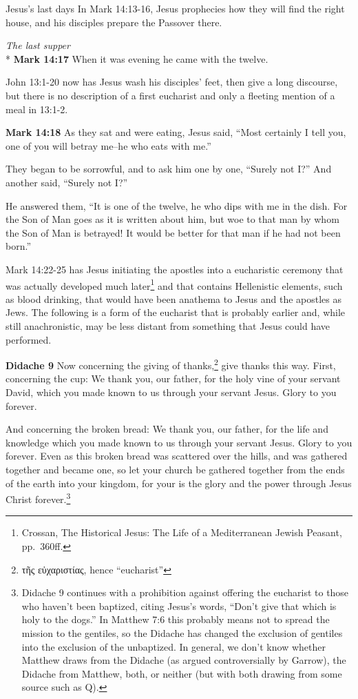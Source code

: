 \documentclass[10pt,a5paper,twoside]{article}
\newcommand{\doimage}[2]{\texttt{[image: \#2]}\label{fig:#2}}
\newcommand{\figbasic}[4]{ %
    \ifthenelse{\isodd{\pageref{fig:#2}}}{}{\hfill}
    \ifstrempty{#3}{
      \doimage{#1}{#2}
    }{
      \makebox{\doimage{#1}{#2} \\ #3}
    }
    \ifthenelse{\isodd{\pageref{fig:#2}}}{\hfill}{}
    \par
}
\newcommand{\fig}[2][0.4]{
  \figbasic{#1}{#2}{}{}
}
\newcommand{\quotesize}{\normalsize{}}
\newcommand{\comm}[1]{\begingroup \color{black!50} #1\endgroup}
\newenvironment{quotetext}{\begingroup\quotesize}{\endgroup}
\newcommand{\intex}[1]{\index[texts]{#1}}
\newcommand{\reftex}[1]{#1\intex{#1}}
\newcommand{\bible}[2]{\begin{quotetext}\textbf{#1}\intex{#1} #2\end{quotetext}}
\newcommand{\gospelmark}[2]{\bible{Mark #1}{#2}}
\newcommand{\subhead}[1]{\emph{#1}\\*}
\begin{document}
\begin{section}{Jesus's last days}
\comm{In \reftex{Mark 14:13-16}, Jesus prophecies how they will find the right house, and his disciples prepare the Passover there.}

\fig[1]{last-supper}

\subhead{The last supper}
\gospelmark{14:17}{
When it was evening he came with the twelve.}

\comm{John 13:1-20 now has Jesus wash his disciples' feet, then give a long discourse, but there is no description of
a first eucharist and only a fleeting mention of a meal in 13:1-2.}

\gospelmark{14:18}{
     As they sat and were eating, Jesus said, ``Most certainly I tell you, one of you will betray me--he who eats with me.''

  They began to be sorrowful, and to ask him one by one, ``Surely not I?'' And another said, ``Surely not I?''

  He answered them, ``It is one of the twelve, he who dips with me in the dish.    For the Son of Man goes as it is written about him, but woe to that man by whom the Son of Man is betrayed! It would be better for that man if he had not been born.''
}

\comm{Mark 14:22-25 has Jesus initiating the apostles into a eucharistic ceremony that was actually developed much 
later\footnote{Crossan, The Historical Jesus: The Life of a Mediterranean Jewish Peasant, pp.~360ff.}
and that contains Hellenistic elements, such as blood drinking, that would have been anathema
to Jesus and the apostles as Jews. The following is a form of the eucharist that
is probably earlier and, while still anachronistic, may be less distant from something that Jesus could have performed.}


\bible{Didache 9}{
Now concerning the giving of thanks,\footnote{τῆς εὐχαριστίας, hence  ``eucharist''} give thanks this way. First, concerning the cup:
We thank you, our father, for the holy vine of your servant David, which you made known to us through your servant Jesus.
Glory to you forever.

And concerning the broken bread:
We thank you, our father, for the life and knowledge which you made known to us through your servant Jesus.
Glory to you forever.
Even as this broken bread was scattered over the hills, and was gathered together and became one, so let
your church be gathered together from the ends of the earth into your kingdom, for your is the glory and the power through Jesus Christ 
forever.\footnote{Didache 9 continues with a prohibition against offering the eucharist to those who haven't been baptized,
citing Jesus's words, ``Don't give that which is holy to the dogs.'' In Matthew 7:6 this probably means not to spread the
mission to the gentiles, so the Didache has changed the exclusion of gentiles into the exclusion of the unbaptized.
In general, we don't know whether Matthew draws from
the Didache (as argued controversially by Garrow), the Didache from Matthew, both, or neither (but with both drawing from some
source such as Q).}
}


\end{section}
\end{document}
